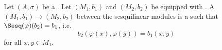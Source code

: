 \begin{definition} \label{definition:morphism_between_modules_with_sesquilinear_forms_over_an_involution_ring}
    Let $(A, \sigma)$ be a . Let $(M_1,b_1)$ and $(M_2,b_2)$ be  equipped with . 
    A  $(M_1,b_1) \to (M_2,b_2)$ between the sesquilinear modules is a  such that $\Sesq(\varphi)(b_2) = b_1$, i.e. 
    $$b_2(\varphi(x), \varphi(y)) = b_1(x,y)$$
    for all $x,y \in M_1$.
\end{definition}
